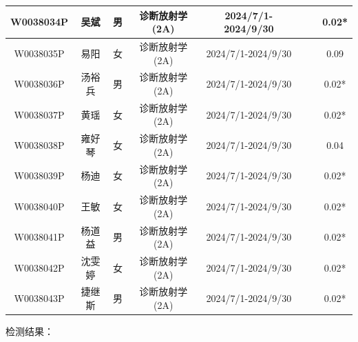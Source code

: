 \begin{table}[H]
\begin{tabular}{|c|c|c|c|c|c|c|c|}
\hline
W0038034P & 吴斌 & 男 & 诊断放射学(2A) & 2024/7/1-2024/9/30 &  &  & 0.02* \\
\hline
W0038035P & 易阳 & 女 & 诊断放射学(2A) & 2024/7/1-2024/9/30 &  &  & 0.09 \\
\hline
W0038036P & 汤裕兵 & 男 & 诊断放射学(2A) & 2024/7/1-2024/9/30 &  &  & 0.02* \\
\hline
W0038037P & 黄瑶 & 女 & 诊断放射学(2A) & 2024/7/1-2024/9/30 &  &  & 0.02* \\
\hline
W0038038P & 雍好琴 & 女 & 诊断放射学(2A) & 2024/7/1-2024/9/30 &  &  & 0.04 \\
\hline
W0038039P & 杨迪 & 女 & 诊断放射学(2A) & 2024/7/1-2024/9/30 &  &  & 0.02* \\
\hline
W0038040P & 王敏 & 女 & 诊断放射学(2A) & 2024/7/1-2024/9/30 &  &  & 0.02* \\
\hline
W0038041P & 杨道益 & 男 & 诊断放射学(2A) & 2024/7/1-2024/9/30 &  &  & 0.02* \\
\hline
W0038042P & 沈雯婷 & 女 & 诊断放射学(2A) & 2024/7/1-2024/9/30 &  &  & 0.02* \\
\hline
W0038043P & 捷继斯 & 男 & 诊断放射学(2A) & 2024/7/1-2024/9/30 &  &  & 0.02* \\
\hline
\end{tabular}
\end{table}


检测结果：


